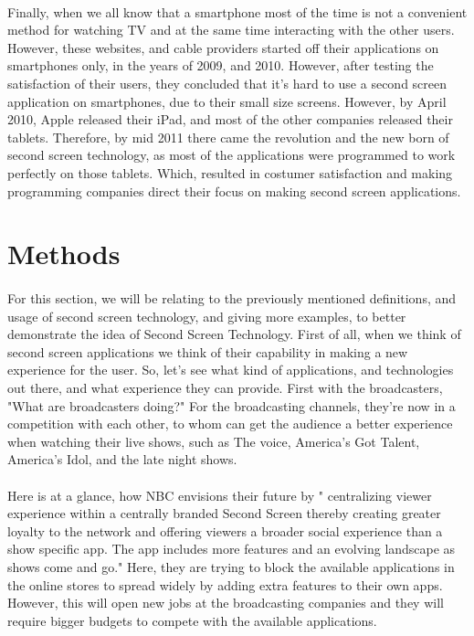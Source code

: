 \documentclass[12pt, oneside]{article}   	%
\begin{document}
 \paragraph{}
 Finally, when we all know that a smartphone most of the time is not a convenient method for watching TV and at the same time interacting with the other users.  However, these websites, and cable providers started off their applications on smartphones only, in the years of 2009, and 2010.  However, after testing the satisfaction of their users, they concluded that it's hard to use a second screen application on smartphones, due to their small size screens.  However, by April 2010, Apple released their iPad, and most of the other companies released their tablets.  Therefore, by mid 2011 there came the revolution and the new born of second screen technology, as most of the applications were programmed to work perfectly on those tablets.  Which, resulted in costumer satisfaction and making programming companies direct their focus on making second screen applications.
 \section{Methods} 
 \paragraph{}
For this section, we will be relating to the previously mentioned definitions, and usage of second screen technology, and giving more examples, to better demonstrate the idea of Second Screen Technology. First of all, when we think of second screen applications we think of their capability in making a new  experience for the user.  So, let's see what kind of applications, and technologies out there, and what experience they can provide.  First with the broadcasters, "What are broadcasters doing?" \cite{Second-Screen-Art}  For the broadcasting channels, they're now in a competition with each other, to whom can get the audience a better experience when watching their live shows, such as The voice, America's Got Talent, America's Idol, and the late night shows.  
 \paragraph{}
Here is at a glance, how NBC envisions their future by " centralizing viewer experience within a centrally branded Second Screen thereby creating greater loyalty to the network and offering viewers a broader social experience than a show specific app.  The app includes more features and an evolving landscape as shows come and go." \cite{Second-Screen-Art}  Here, they are trying to block the available applications in the online stores to spread widely by adding extra features to their own apps.  However, this will open new jobs at the broadcasting companies and they will require bigger budgets to compete with the available applications.
\end{document}
